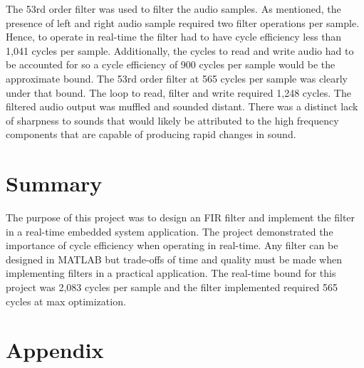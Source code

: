 \documentclass[11pt,pdftex,portrait,letterpaper]{article}
\begin{document}
The 53rd order filter was used to filter the audio samples. As mentioned, the presence of left and right audio sample required two filter operations per sample. Hence, to operate in real-time the filter had to have cycle efficiency less than 1,041 cycles per sample. Additionally, the cycles to read and write audio had to be accounted for so a cycle efficiency of 900 cycles per sample would be the approximate bound. The 53rd order filter at 565 cycles per sample was clearly under that bound. The loop to read, filter and write required 1,248 cycles. The filtered audio output was muffled and sounded distant. There was a distinct lack of sharpness to sounds that would likely be attributed to the high frequency components that are capable of producing rapid changes in sound.

\section{Summary}

The purpose of this project was to design an FIR filter and implement the filter in a real-time embedded system application. The project demonstrated the importance of cycle efficiency when operating in real-time. Any filter can be designed in MATLAB but trade-offs of time and quality must be made when implementing filters in a practical application. The real-time bound for this project was 2,083 cycles per sample and the filter implemented required 565 cycles at max optimization.

\pagebreak

\section{Appendix}
\end{document}
